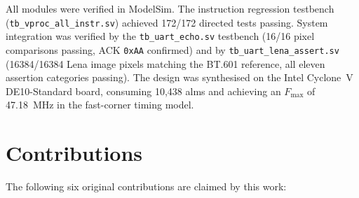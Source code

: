 All modules were verified in ModelSim. The instruction regression testbench
(\texttt{tb\_vproc\_all\_instr.sv}) achieved 172/172 directed tests passing. System
integration was verified by the \texttt{tb\_uart\_echo.sv} testbench (16/16 pixel
comparisons passing, ACK \texttt{0xAA} confirmed) and by \texttt{tb\_uart\_lena\_assert.sv}
(16384/16384 Lena image pixels matching the BT.601 reference, all eleven assertion
categories passing). The design was synthesised on the Intel Cyclone~V DE10-Standard
board, consuming 10,438 \glspl{alm} and achieving an $F_\text{max}$ of 47.18~MHz in
the fast-corner timing model.

\section{Contributions}
\label{sec:contributions_ch7}

The following six original contributions are claimed by this work:

